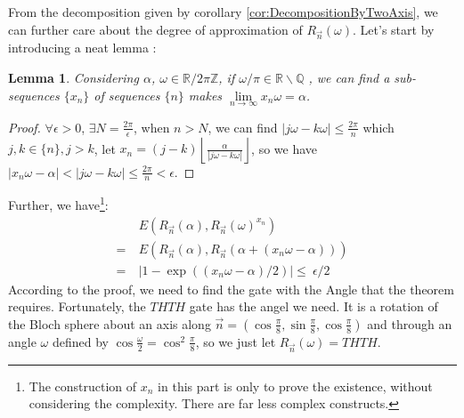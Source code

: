 \documentclass[a4paper,10pt]{book}
\newtheorem{lemma}{Lemma}[section]
\numberwithin{equation}{section}
\begin{document}
From the decomposition given by corollary \ref{cor:DecompositionByTwoAxis}, we can further care about the degree of approximation of $R_{\vec{n}}(\omega)$. Let's start by introducing a neat lemma :
\begin{lemma}\label{AngleCoverR}
    Considering $\alpha$, $\omega \in \mathbb{R} /2\pi\mathbb{Z}$, if $\omega/\pi \in \mathbb{R} \backslash \mathbb{Q}$ , we can find a sub-sequences $\{x_n\}$ of sequences $\{n\}$ makes $\lim\limits_{n\to\infty}x_n\omega = \alpha$.
\end{lemma}
\begin{proof}
    $\forall \epsilon>0$, $\exists N=\frac{2\pi}{\epsilon}$, when $n>N$, we can find $|j\omega-k\omega|\leq\frac{2\pi}{n}$ which $j,k \in \{n\},j>k$, let $x_{n} = (j-k)\left\lfloor\frac{\alpha}{|j\omega-k\omega|}\right\rfloor$, so we have $|x_{n}\omega-\alpha|<|j\omega-k\omega|\leq\frac{2\pi}{n}<\epsilon$.
\end{proof}
Further, we have\footnote{The construction of $x_{n}$ in this part is only to prove the existence, without considering the complexity. There are far less complex constructs.}:
\begin{equation}
    \begin{split}
          & \ E(R_{\vec{n}}(\alpha),R_{\vec{n}}(\omega)^{x_{n}})              \\
        = & \ E(R_{\vec{n}}(\alpha),R_{\vec{n}}(\alpha+(x_{n}\omega-\alpha))) \\
        = & \ |1-\exp((x_{n}\omega-\alpha)/2)|\leq\ \epsilon/2
    \end{split}
\end{equation}
According to the proof, we need to find the gate with the Angle that the theorem requires. Fortunately, the $THTH$ gate has the angel we need. It is a rotation of the Bloch sphere about an axis along $\vec{n} = (\cos\frac{\pi}{8},\sin\frac{\pi}{8},\cos\frac{\pi}{8})$ and through an angle $\omega$ defined by $\cos\frac{\omega}{2} = \cos^{2}\frac{\pi}{8}$, so we just let $R_{\vec{n}}(\omega) = THTH$.
\end{document}
